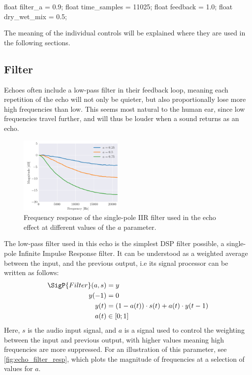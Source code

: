 \begin{cppcodenl}
  float filter_a = 0.9;
  float time_samples = 11025;
  float feedback = 1.0;
  float dry_wet_mix = 0.5;
\end{cppcodenl}

The meaning of the individual controls will be explained where they are used in the following sections.

\subsection{Filter}

Echoes often include a low-pass filter in their feedback loop, meaning each repetition of the echo will not
only be quieter, but also proportionally lose more high frequencies than low. This seems most natural to the
human ear, since low frequencies travel further, and will thus be louder when a sound returns as an echo.

\begin{figure}
  \centering
  \includegraphics[width=0.45\textwidth]{Pictures/echo_filter_resp.png}
  \caption{Frequency response of the single-pole IIR filter used in the echo effect at different values of the
    $a$ parameter.}
  \label{fig:echo_filter_resp}
\end{figure}
% 
The low-pass filter used in this echo is the simplest DSP filter possible, a single-pole Infinite Impulse
Response filter. It can be understood as a weighted average between the input, and the previous output, i.e
its signal processor can be written as follows:
\begin{align*}
  \SigP{Filter}(a, s) & = y                                           \\
  y(-1)               & = 0                                           \\
  y(t)                & = (1 - a(t)) \cdot s(t) + a(t) \cdot y(t - 1) \\
  a(t)                & \in [0; 1]                                    \\
\end{align*}
% 
Here, $s$ is the audio input signal, and $a$ is a signal used to control
the weighting between the input and previous output, with higher values meaning high frequencies are more
suppressed. For an illustration of this parameter, see \autoref{fig:echo_filter_resp}, which plots the magnitude of
frequencies at a selection of values for $a$.

